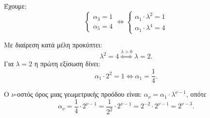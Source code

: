 
\begin{alist}
\item Έχουμε:
\[\begin{cases} \alpha_3 = 1 \\ \alpha_5 = 4 \end{cases} \Leftrightarrow \begin{cases} \alpha_1 \cdot \lambda^2 = 1 \\ \alpha_1 \cdot \lambda^4 = 4 \end{cases}\]

Με διαίρεση κατά μέλη προκύπτει:
\[\lambda^2 = 4 \overset{\lambda > 0}{\Leftrightarrow} \lambda = 2.\]
Για $\lambda = 2$ η πρώτη εξίσωση δίνει:
\[\alpha_1 \cdot 2^2 = 1 \Leftrightarrow \alpha_1 = \dfrac{1}{4}.\]

\item Ο $\nu$-οστός όρος μιας γεωμετρικής προόδου είναι: $\alpha_\nu = \alpha_1 \cdot \lambda^{\nu-1}$, οπότε
\[\alpha_\nu = \dfrac{1}{4} \cdot 2^{\nu-1} = \dfrac{1}{2^2} \cdot 2^{\nu-1} = 2^{-2} \cdot 2^{\nu-1} = 2^{\nu-3}.\]
\end{alist}

